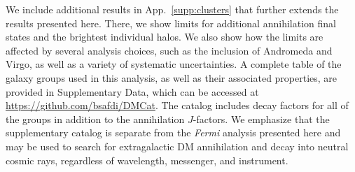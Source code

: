 We include additional results in App.~\ref{supp:clusters} that further extends the results presented here.  There, we show limits for additional annihilation final states and the brightest individual halos.  We also show how the limits are affected by several analysis choices, such as the inclusion of Andromeda and Virgo, as well as a variety of systematic uncertainties.  A complete table of the galaxy groups used in this analysis, as well as their associated properties, are provided in Supplementary Data, which can be accessed at \url{https://github.com/bsafdi/DMCat}.  The catalog includes decay factors for all of the groups in addition to the annihilation $J$-factors.  We emphasize that the supplementary catalog is separate from the {\it Fermi} analysis presented here and may be used to search for extragalactic DM annihilation and decay into neutral cosmic rays, regardless of wavelength, messenger, and instrument.


\sectionline 


